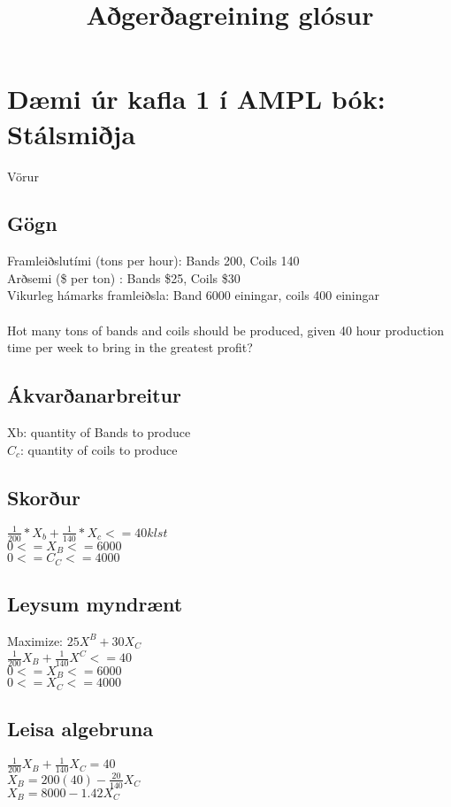 \documentclass[]{article}
\begin{document}
\title{Aðgerðagreining glósur}
\maketitle

\section*{Dæmi úr kafla 1 í AMPL bók: Stálsmiðja}

Vörur

\subsection*{Gögn}
Framleiðslutími (tons per hour): Bands 200, Coils 140\\
Arðsemi (\$ per ton) : Bands \$25, Coils \$30 \\
Vikurleg hámarks framleiðsla: Band 6000 einingar, coils 400 einingar \\
\\
Hot many tons of bands and coils should be produced, given 40 hour production time per week to bring in the greatest profit?
\subsection*{Ákvarðanarbreitur}
Xb: quantity of Bands to produce \\
$C_{c}$: quantity of coils to produce \\

\subsection*{Skorður}

$ \frac{1}{200} * X_{b} + \frac{1}{140}*X_{c} <= 40 klst $ \\
$0 <= X_{B} <= 6000$\\
$0 <= C_{C} <= 4000$\\

\subsection*{Leysum myndrænt}
Maximize: $25X^{B} + 30X_{C}$ \\
$\frac{1}{200}X_{B} + \frac{1}{140}X^{C}<=40$ \\
$0 <= X_{B} <= 6000$ \\
$0 <= X_{C} <= 4000$ \\

\subsection*{Leisa algebruna}
$\frac{1}{200}X_{B} + \frac{1}{140}X_{C} = 40$ \\
$X_{B} = 200(40) - \frac{20}{140}X_{C}$ \\
$X_{B} = 8000 - 1.42X_{C}$
\end{document}
